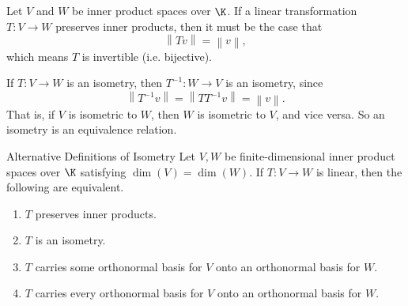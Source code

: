 \documentclass[linearalgebraII]{subfiles}
\begin{document}
    \begin{remark}
        Let $V$ and $W$ be inner product spaces over $\K$. If a linear transformation $T:V\to W$ preserves inner products, then it must be the case that
        \begin{equation*}
            \left\lVert Tv\right\rVert = \left\lVert v\right\rVert ,
        \end{equation*}
        which means $T$ is invertible (i.e. bijective).
    \end{remark}

    \begin{remark}
        If $T:V\to W$ is an isometry, then $T^{-1}:W\to V$ is an isometry, since
        \begin{equation*}
            \left\lVert T^{-1}v\right\rVert = \left\lVert TT^{-1}v\right\rVert = \left\lVert v\right\rVert.
        \end{equation*}
        That is, if $V$ is isometric to $W$, then $W$ is isometric to $V$, and vice versa. So an isometry is an equivalence relation.
    \end{remark}

    \begin{prop}{Alternative Definitions of Isometry}
        Let $V,W$ be finite-dimensional inner product spaces over $\K$ satisfying $\dim(V)=\dim(W)$. If $T:V\to W$ is linear, then the following are equivalent.
        \begin{enumerate}
            \item $T$ preserves inner products.
            \item $T$ is an isometry.
            \item $T$ carries some orthonormal basis for $V$ onto an orthonormal basis for $W$.
            \item $T$ carries every orthonormal basis for $V$ onto an orthonormal basis for $W$.
        \end{enumerate}
    \end{prop}
\end{document}

